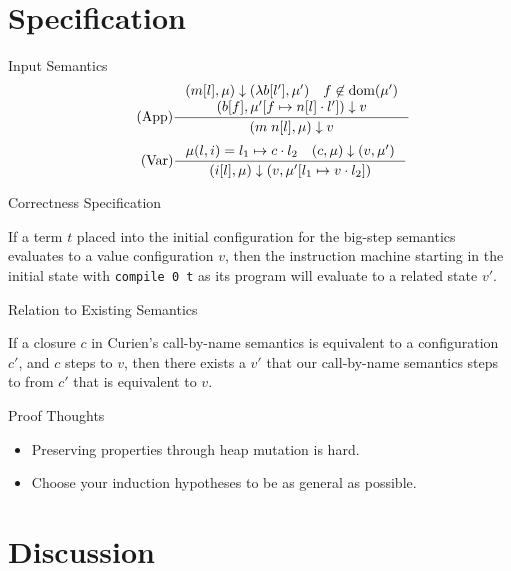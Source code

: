 \documentclass[14pt]{beamer}
\begin{document}
\section{Specification}
\begin{frame}{Input Semantics}
\begin{align*}
\tag{App} \inference
{(m[l], \mu) \downarrow (\lambda b[l'], \mu') \quad f \not \in \textnormal{dom}(\mu') \\ 
(b[f], \mu'[f \mapsto n[l] \cdot l']) \downarrow v}
{(m \; n[l], \mu) \downarrow v}  
\end{align*}
\begin{align*}
\tag{Var} \inference
{\mu(l, i) = l_1 \mapsto c \cdot l_2 \quad (c, \mu) \downarrow (v, \mu')}
{(i[l],\mu) \downarrow (v, \mu'[l_1 \mapsto v \cdot l_2])}
\end{align*}
\end{frame}

\begin{frame}{Correctness Specification}
\begin{theorem} 
If a term $t$ placed into the initial configuration for the big-step semantics
evaluates to a value configuration $v$, then the instruction machine starting
in the initial state with \texttt{compile 0 t} as its program will evaluate to a
related state $v'$.  
\end{theorem}
\end{frame}

\begin{frame}{Relation to Existing Semantics}
\begin{theorem}
If a closure $c$ in Curien's call-by-name semantics is equivalent to a
configuration $c'$, and $c$ steps to $v$, then there exists a $v'$ that our
call-by-name semantics steps to from $c'$ that is equivalent to $v$.
\end{theorem}
\end{frame}

\begin{frame}{Proof Thoughts}
\begin{itemize}
\item Preserving properties through heap mutation is hard.
\item Choose your induction hypotheses to be as general as possible.
\end{itemize}
\end{frame}

\section{Discussion}
\end{document}
